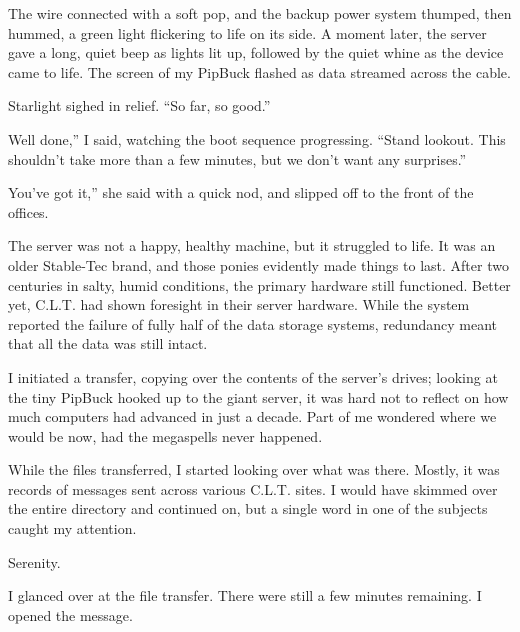 The wire connected with a soft pop, and the backup power system thumped, then hummed, a green light flickering to life on its side. A moment later, the server gave a long, quiet beep as lights lit up, followed by the quiet whine as the device came to life. The screen of my PipBuck flashed as data streamed across the cable.

Starlight sighed in relief. “So far, so good.”

\leavevmode{}Well done,” I said, watching the boot sequence progressing. “Stand lookout. This shouldn’t take more than a few minutes, but we don’t want any surprises.”

\leavevmode{}You’ve got it,” she said with a quick nod, and slipped off to the front of the offices.

The server was not a happy, healthy machine, but it struggled to life. It was an older Stable-Tec brand, and those ponies evidently made things to last. After two centuries in salty, humid conditions, the primary hardware still functioned. Better yet, C.L.T. had shown foresight in their server hardware. While the system reported the failure of fully half of the data storage systems, redundancy meant that all the data was still intact.

I initiated a transfer, copying over the contents of the server’s drives; looking at the tiny PipBuck hooked up to the giant server, it was hard not to reflect on how much computers had advanced in just a decade. Part of me wondered where we would be now, had the megaspells never happened.

While the files transferred, I started looking over what was there. Mostly, it was records of messages sent across various C.L.T. sites. I would have skimmed over the entire directory and continued on, but a single word in one of the subjects caught my attention.


Serenity.

I glanced over at the file transfer. There were still a few minutes remaining. I opened the message.

